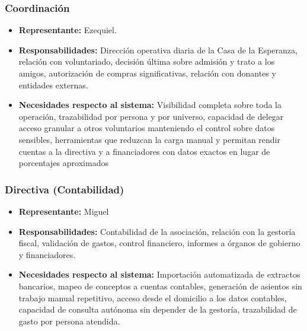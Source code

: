 \subsubsection{Coordinación}
\begin{itemize}
    \item \textbf{Representante:} Ezequiel.
    
    \item \textbf{Responsabilidades:} Dirección operativa diaria de la Casa de la Esperanza,
    relación con voluntariado, decisión última sobre admisión y trato a los
    amigos, autorización de compras significativas, relación con donantes y
    entidades externas.
    
    \item \textbf{Necesidades respecto al sistema:} Visibilidad completa sobre toda la
    operación, trazabilidad por persona y
    por universo, capacidad de delegar acceso granular a otros voluntarios
    manteniendo el control sobre datos sensibles, herramientas que reduzcan la
    carga manual y permitan rendir cuentas a la directiva y a financiadores con
    datos exactos en lugar de porcentajes aproximados
\end{itemize}


\subsubsection{Directiva (Contabilidad)}
\begin{itemize}
    \item \textbf{Representante:} Miguel 
    
    \item \textbf{Responsabilidades:} Contabilidad de la asociación, relación con la
    gestoría fiscal, validación de gastos, control financiero, informes a
    órganos de gobierno y financiadores.
    
    \item \textbf{Necesidades respecto al sistema:} Importación automatizada de extractos
    bancarios, mapeo de conceptos a cuentas contables, generación de asientos
    sin trabajo manual repetitivo, acceso desde el domicilio a los datos
    contables, capacidad de consulta autónoma sin depender de la gestoría,
    trazabilidad de gasto por persona atendida.
\end{itemize}


